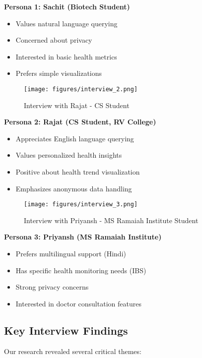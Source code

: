\textbf{Persona 1: Sachit (Biotech Student)}
\begin{itemize}
    \item Values natural language querying
    \item Concerned about privacy
    \item Interested in basic health metrics
    \item Prefers simple visualizations
\end{itemize}

\begin{figure}[H]
    \centering
    \texttt{[image: figures/interview\_2.png]}
    \caption{Interview with Rajat - CS Student}
\end{figure}

\textbf{Persona 2: Rajat (CS Student, RV College)}
\begin{itemize}
    \item Appreciates English language querying
    \item Values personalized health insights
    \item Positive about health trend visualization
    \item Emphasizes anonymous data handling
\end{itemize}

\begin{figure}[H]
    \centering
    \texttt{[image: figures/interview\_3.png]}
    \caption{Interview with Priyansh - MS Ramaiah Institute Student}
\end{figure}

\textbf{Persona 3: Priyansh (MS Ramaiah Institute)}
\begin{itemize}
    \item Prefers multilingual support (Hindi)
    \item Has specific health monitoring needs (IBS)
    \item Strong privacy concerns
    \item Interested in doctor consultation features
\end{itemize}

\subsection{Key Interview Findings}
Our research revealed several critical themes:

